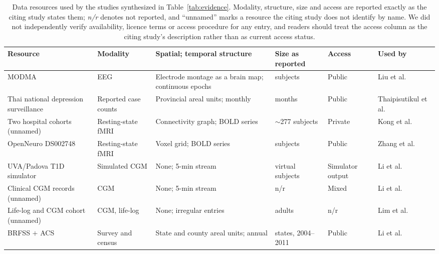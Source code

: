 \documentclass[journal]{IEEEtran}
\newif\ifsubmission
\begin{document}
\ifsubmission\else
\begin{table}[p]
\centering
\caption{Data resources used by the studies synthesized in Table~\ref{tab:evidence}. Modality, structure, size and access are reported exactly as the citing study states them; \emph{n/r} denotes not reported, and ``unnamed'' marks a resource the citing study does not identify by name. We did not independently verify availability, licence terms or access procedure for any entry, and readers should treat the access column as the citing study's description rather than as current access status.}
\label{tab:datasets}
\scriptsize
\setlength{\tabcolsep}{4pt}
\renewcommand{\arraystretch}{1.12}
\begin{tabularx}{\textwidth}{>{\raggedright\arraybackslash}p{4.0cm} >{\raggedright\arraybackslash}p{2.2cm} >{\raggedright\arraybackslash}X >{\raggedright\arraybackslash}p{2.5cm} >{\raggedright\arraybackslash}p{1.7cm} >{\raggedright\arraybackslash}p{2.8cm}}
\toprule
\textbf{Resource} & \textbf{Modality} & \textbf{Spatial; temporal structure} & \textbf{Size as reported} & \textbf{Access} & \textbf{Used by} \\
\midrule
MODMA & EEG & Electrode montage as a brain map; continuous epochs & 53 subjects & Public & Liu et al.~\cite{2} \\
\addlinespace[1pt]
Thai national depression surveillance & Reported case counts & Provincial areal units; monthly & 70 months & Public & Thaipisutikul et al.~\cite{3} \\
\addlinespace[1pt]
Two hospital cohorts (unnamed) & Resting-state fMRI & Connectivity graph; BOLD series & $\sim$277 subjects & Private & Kong et al.~\cite{4} \\
\addlinespace[1pt]
OpenNeuro DS002748 & Resting-state fMRI & Voxel grid; BOLD series & 72 subjects & Public & Zhang et al.~\cite{9} \\
\addlinespace[1pt]
UVA/Padova T1D simulator & Simulated CGM & None; 5-min stream & 10 virtual subjects & Simulator output & Li et al.~\cite{Li2020GluNet} \\
\addlinespace[1pt]
Clinical CGM records (unnamed) & CGM & None; 5-min stream & n/r & Mixed & Li et al.~\cite{Li2020GluNet} \\
\addlinespace[1pt]
Life-log and CGM cohort (unnamed) & CGM, life-log & None; irregular entries & 171 adults & n/r & Lim et al.~\cite{Lim2025VirtualCGM} \\
\addlinespace[1pt]
BRFSS $+$ ACS & Survey and census & State and county areal units; annual & 48 states, 2004--2011 & Public & Li et al.~\cite{XiaoLi2016DiabetesSpatiotemporal} \\

\end{tabularx}
\end{table}
\end{document}
